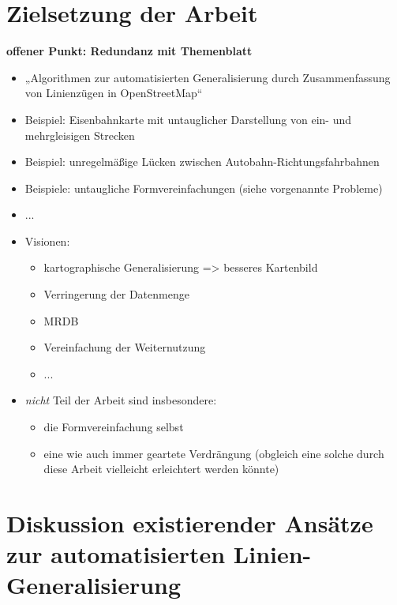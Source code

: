 \documentclass{../thesis}
\begin{document}
\section{Zielsetzung der Arbeit}

\textbf{offener Punkt: Redundanz mit Themenblatt}

\begin{itemize}
	\item „Algorithmen zur automatisierten Generalisierung durch Zusammenfassung von Linienzügen in OpenStreetMap“
	\item Beispiel: Eisenbahnkarte mit untauglicher Darstellung von ein- und mehrgleisigen Strecken
	\item Beispiel: unregelmäßige Lücken zwischen Autobahn-Richtungsfahrbahnen
	\item Beispiele: untaugliche Formvereinfachungen (siehe vorgenannte Probleme)
	\item ...
	\item Visionen:
	\begin{itemize}
		\item kartographische Generalisierung => besseres Kartenbild
		\item Verringerung der Datenmenge
		\item MRDB
		\item Vereinfachung der Weiternutzung
		\item ...
	\end{itemize}
	\item \emph{nicht} Teil der Arbeit sind insbesondere:
	\begin{itemize}
		\item die Formvereinfachung selbst
		\item eine wie auch immer geartete Verdrängung (obgleich eine solche durch diese Arbeit vielleicht erleichtert werden könnte)
	\end{itemize}
\end{itemize}


\section[Diskussion existierender Ansätze]{Diskussion existierender Ansätze zur automatisierten Linien-Generalisierung}
\end{document}
